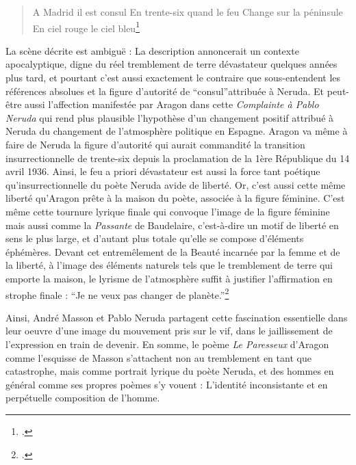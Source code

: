 

\begin{verse}
A Madrid il est consul 
En trente-six quand le feu
Change sur la péninsule
En ciel rouge le ciel bleu\footcite{pabloneruda}	
\end{verse}
 
	La scène décrite est ambiguë : La description annoncerait un contexte apocalyptique, digne du réel tremblement de terre dévastateur quelques années plus tard, et pourtant c’est aussi exactement le contraire que sous-entendent les références absolues et la figure d’autorité de \enquote{consul}attribuée à Neruda. Et peut-être aussi l’affection manifestée par Aragon dans cette \emph{Complainte à Pablo Neruda} qui rend plus plausible l’hypothèse d’un changement positif attribué à Neruda du changement de l’atmosphère politique en Espagne. Aragon va même à faire de Neruda la figure d’autorité qui aurait commandité la transition insurrectionnelle de trente-six depuis la proclamation de la 1ère République du 14 avril 1936. Ainsi, le feu a priori dévastateur est aussi la force tant poétique qu’insurrectionnelle du poète Neruda avide de liberté. Or, c’est aussi cette même liberté qu’Aragon prête à la maison du poète, associée à la figure féminine. C’est même cette tournure lyrique finale qui convoque l’image de la figure féminine mais aussi comme la \emph{Passante} de Baudelaire, c’est-à-dire un motif de liberté en sens le plus large, et d’autant plus totale qu’elle se compose d’éléments éphémères. Devant cet entremêlement de la Beauté incarnée par la femme et de la liberté, à l’image des éléments naturels tels que le tremblement de terre qui emporte la maison, le lyrisme de l’atmosphère suffit à justifier l’affirmation en strophe finale : \enquote{Je ne veux pas changer de planète.}\footcite{pabloneruda}

Ainsi, André Masson et Pablo Neruda partagent cette fascination essentielle dans leur oeuvre d’une image du mouvement pris sur le vif, dans le jaillissement de l’expression en train de devenir. En somme, le poème \emph{Le Paresseux} d’Aragon comme l’esquisse de Masson s’attachent non au tremblement en tant que catastrophe, mais comme portrait lyrique du poète Neruda, et des hommes en général comme ses propres poèmes s’y vouent : L’identité inconsistante et en perpétuelle composition de l’homme.


